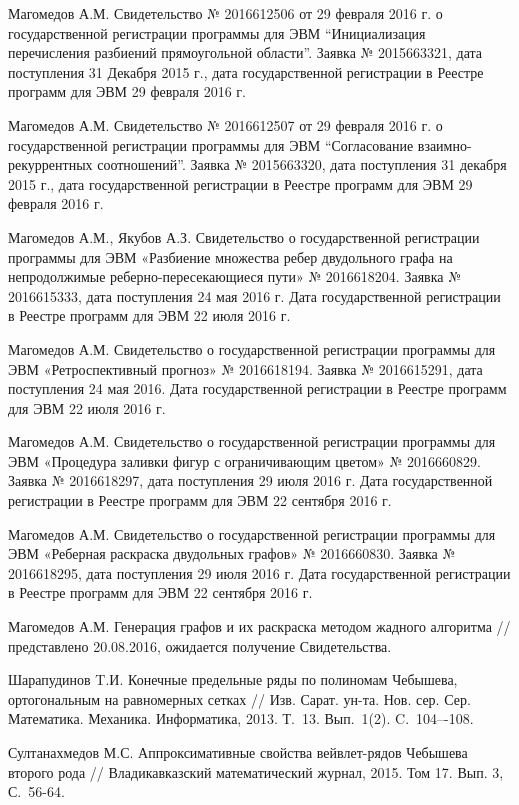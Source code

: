\begin{thebibliography}{1}
Магомедов А.М. Свидетельство № 2016612506 от 29 февраля 2016 г. о государственной регистрации программы для ЭВМ “Инициализация перечисления разбиений прямоугольной области”. Заявка № 2015663321, дата поступления 31 Декабря 2015 г., дата государственной регистрации в Реестре программ для ЭВМ 29 февраля 2016 г.

Магомедов А.М. Свидетельство № 2016612507 от 29 февраля 2016 г. о государственной регистрации программы для ЭВМ “Согласование взаимно-рекуррентных соотношений”. Заявка № 2015663320, дата поступления 31 декабря 2015 г., дата государственной регистрации в Реестре программ для ЭВМ 29 февраля 2016 г.

Магомедов А.М., Якубов А.З. Свидетельство о государственной регистрации программы для ЭВМ «Разбиение множества ребер двудольного графа на непродолжимые реберно-пересекающиеся пути» № 2016618204. Заявка № 2016615333, дата поступления 24 мая 2016 г. Дата государственной регистрации в Реестре программ для ЭВМ 22 июля 2016 г.

Магомедов А.М. Свидетельство о государственной регистрации программы для ЭВМ «Ретроспективный прогноз» № 2016618194. Заявка № 2016615291, дата поступления 24 мая 2016. Дата государственной регистрации в Реестре программ для ЭВМ 22 июля 2016 г.

Магомедов А.М. Свидетельство о государственной регистрации программы для ЭВМ «Процедура заливки фигур с ограничивающим цветом» № 2016660829. Заявка № 2016618297, дата поступления 29 июля 2016 г. Дата государственной регистрации в Реестре программ для ЭВМ 22 сентября 2016 г.


Магомедов А.М. Свидетельство о государственной регистрации программы для ЭВМ «Реберная раскраска двудольных графов» № 2016660830. Заявка № 2016618295, дата поступления 29 июля 2016 г. Дата государственной регистрации в Реестре программ для ЭВМ 22 сентября 2016 г.

Магомедов А.М. Генерация графов и их раскраска методом жадного алгоритма // представлено 20.08.2016, ожидается получение Свидетельства.


 Шарапудинов T.И.
Конечные предельные ряды по полиномам Чебышева, ортогональным на равномерных сетках
// Изв. Сарат. ун-та. Нов. сер. Сер. Математика. Механика. Информатика, 2013. Т.~13. Вып.~1(2). C.~104–-108.

Султанахмедов М.С. Аппроксимативные свойства вейвлет-рядов Чебышева второго рода  // Владикавказский математический журнал, 2015. Том 17. Вып. 3, С.~56-64.




\end{thebibliography}
